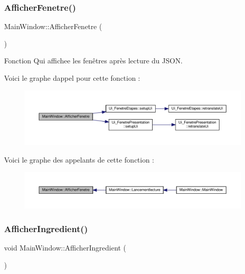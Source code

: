 \subsubsection{\texorpdfstring{Afficher\+Fenetre()}{AfficherFenetre()}}
{\footnotesize\ttfamily Main\+Window\+::\+Afficher\+Fenetre (\begin{DoxyParamCaption}{ }\end{DoxyParamCaption})}



Fonction Qui affichee les fenêtres après lecture du J\+S\+ON. 

Voici le graphe d\textquotesingle{}appel pour cette fonction \+:
\nopagebreak
\begin{figure}[H]
\begin{center}
\leavevmode
\includegraphics[width=350pt]{class_main_window_a7f4b9726171670ec8d85bb6b09e0665d_cgraph}
\end{center}
\end{figure}
Voici le graphe des appelants de cette fonction \+:
\nopagebreak
\begin{figure}[H]
\begin{center}
\leavevmode
\includegraphics[width=350pt]{class_main_window_a7f4b9726171670ec8d85bb6b09e0665d_icgraph}
\end{center}
\end{figure}
\mbox{\label{class_main_window_ad4059abf16eb904f988371b3791002bf}} 
\subsubsection{\texorpdfstring{Afficher\+Ingredient()}{AfficherIngredient()}}
{\footnotesize\ttfamily void Main\+Window\+::\+Afficher\+Ingredient (\begin{DoxyParamCaption}{ }\end{DoxyParamCaption})}

